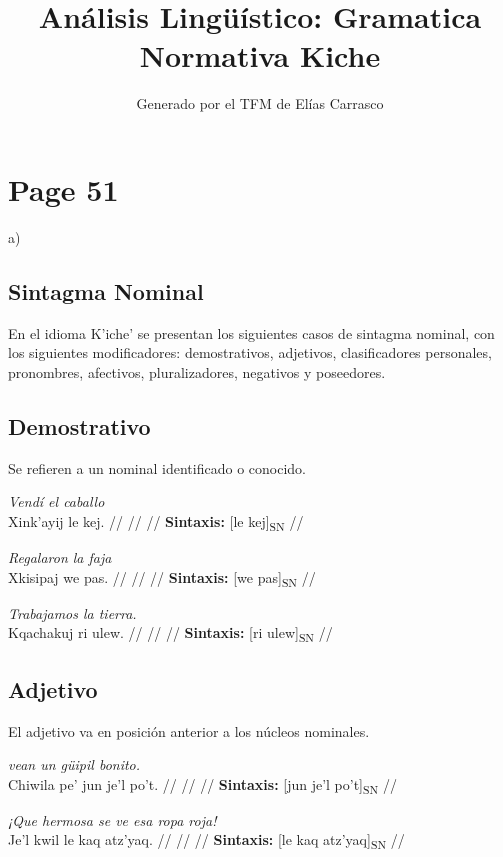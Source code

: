 \documentclass{article}%
\title{Análisis Lingüístico: Gramatica Normativa Kiche}%
\author{Generado por el TFM de Elías Carrasco}%
\begin{document}
%
\normalsize%
\maketitle%
\section{Page 51}%
\label{sec:Page51}%
a) %
\subsection{Sintagma Nominal}%
\label{subsec:SintagmaNominal}%

%
En el idioma K'iche' se presentan los siguientes casos de sintagma nominal, con los %
siguientes modificadores: demostrativos, adjetivos, clasificadores personales, pronombres, %
afectivos, pluralizadores, negativos y poseedores. %
\subsection{Demostrativo}%
\label{subsec:Demostrativo}%

%
Se refieren a un nominal identificado o conocido. %
\par\medskip%
\ex
\textit{Vendí el caballo} \\
\begingl
\gla Xink'ayij le kej. //
\glb  //
\glc  //
\glft \textbf{Sintaxis:} [le kej]\textsubscript{SN} //
\endgl
\xe
%
\medskip%
\par\medskip%
\ex
\textit{Regalaron la faja} \\
\begingl
\gla Xkisipaj we pas. //
\glb  //
\glc  //
\glft \textbf{Sintaxis:} [we pas]\textsubscript{SN} //
\endgl
\xe
%
\medskip%
\par\medskip%
\ex
\textit{Trabajamos la tierra.} \\
\begingl
\gla Kqachakuj ri ulew. //
\glb  //
\glc  //
\glft \textbf{Sintaxis:} [ri ulew]\textsubscript{SN} //
\endgl
\xe
%
\medskip%
\subsection{Adjetivo}%
\label{subsec:Adjetivo}%

%
El adjetivo va en posición anterior a los núcleos nominales. %
\par\medskip%
\ex
\textit{vean un güipil bonito.} \\
\begingl
\gla Chiwila pe' jun je'l po't. //
\glb  //
\glc  //
\glft \textbf{Sintaxis:} [jun je'l po't]\textsubscript{SN} //
\endgl
\xe
%
\medskip%
\par\medskip%
\ex
\textit{¡Que hermosa se ve esa ropa roja!} \\
\begingl
\gla Je'l kwil le kaq atz'yaq. //
\glb  //
\glc  //
\glft \textbf{Sintaxis:} [le kaq atz'yaq]\textsubscript{SN} //
\endgl
\xe
%
\medskip%
\end{document}
